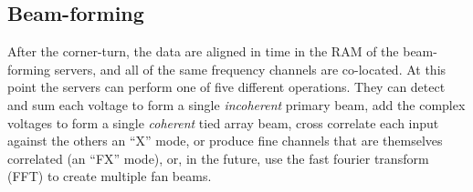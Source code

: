 \subsection{Beam-forming}

After the corner-turn, the data are aligned in time in the RAM of the beam-forming servers, and all of the same frequency channels are co-located. At this point the servers can perform one of five different operations. They can detect and sum each voltage to form a single \textit{incoherent} primary beam, add the complex voltages to form a single \textit{coherent} tied array beam, cross correlate each input against the others an ``X'' mode, or produce fine channels that are themselves correlated (an ``FX'' mode), or, in the future, use the fast fourier transform (FFT) to create multiple fan beams. 